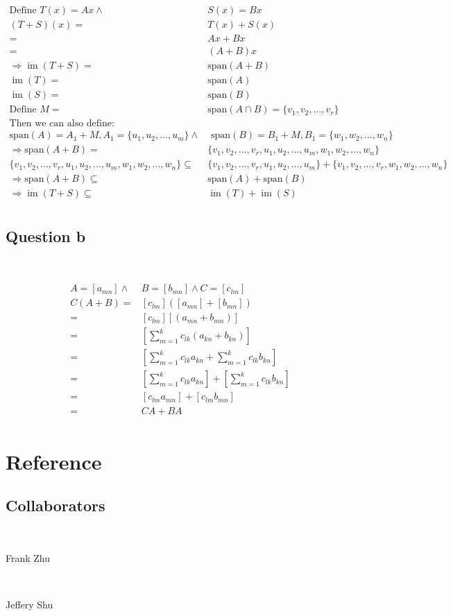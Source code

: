 \documentclass{article}
\DeclareMathOperator{\im}{im}
\begin{document}
\begin{equation*}
\begin{split}
\text{Define } T(x)=Ax \land & S(x)=Bx\\
(T+S)(x)=&T(x)+S(x)\\
=&Ax+Bx\\
=&(A+B)x\\
\Rightarrow \im(T+S)=&\text{span}(A+B)\\
\im(T)=&\text{span}(A)\\
\im(S)=&\text{span}(B)\\
\text{Define }M=&\text{span}(A\cap B)=\{v_1,v_2,...,v_r\}\\
\text{Then we can also define: }&\\
\text{span}(A)=A_1+M, A_1=\{u_1,u_2,...,u_m\}\land& \text{ span}(B)=B_1+M, B_1=\{w_1,w_2,...,w_n\}\\
\Rightarrow \text{span}(A+B)=&\{v_1,v_2,...,v_r,u_1,u_2,...,u_m,w_1,w_2,...,w_n\}\\
\{v_1,v_2,...,v_r,u_1,u_2,...,u_m,w_1,w_2,...,w_n\}\subseteq &\{v_1,v_2,...,v_r,u_1,u_2,...,u_m\}+\{v_1,v_2,...,v_r,w_1,w_2,...,w_n\}\\
\Rightarrow \text{span}(A+B)\subseteq &\text{span}(A)+\text{span}(B)\\
\Rightarrow \im(T+S)\subseteq &\im(T)+\im(S)\\
\end{split}
\end{equation*}

\subsection{Question b}

~

\begin{equation*}
\begin{split}
A=\left[a_{mn}\right]\land &B=\left[b_{mn}\right]\land C=\left[c_{lm}\right]\\
C(A+B)=&\left[c_{lm}\right](\left[a_{mn}\right]+\left[b_{mn}\right])\\
=&[c_{lm}]\left[(a_{mn}+b_{mn})\right]\\
=&\left[\sum^k_{m=1}c_{lk}(a_{kn}+b_{kn})\right]\\
=&\left[\sum^k_{m=1}c_{lk}a_{kn}+\sum^k_{m=1}c_{lk}b_{kn}\right]\\
=&\left[\sum^k_{m=1}c_{lk}a_{kn}\right]+\left[\sum^k_{m=1}c_{lk}b_{kn}\right]\\
=&\left[c_{lm}a_{mn}\right]+\left[c_{lm}b_{mn}\right]\\
=&CA+BA\\
\end{split}
\end{equation*}

\newpage

\section{Reference}

\subsection{Collaborators}

~

Frank Zhu

~

Jeffery Shu
\end{document}
